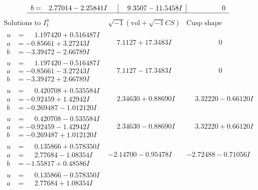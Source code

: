 \documentclass[1p]{elsarticle_modified}
\theoremstyle{definition}
\newcommand{\I}{\sqrt{-1}}
\begin{document}
$$\begin{array}{c|c|c}
\begin{aligned}
b &= \phantom{-}2.77014 - 2.25841 I\end{aligned}
 & \phantom{-}9.3507 - 11.5458 I & \phantom{-0.000000 } 0\\
 \hline 
 \end{array}$$\newpage$$\begin{array}{c|c|c}  
\text{Solutions to }I^u_{1}& \I (\text{vol} + \sqrt{-1}CS) & \text{Cusp shape}\\
 \hline 
\begin{aligned}
u &= \phantom{-}1.197420 + 0.516487 I \\
a &= -0.85661 + 3.27243 I \\
b &= -3.39472 - 2.66789 I\end{aligned}
 & \phantom{-}7.1127 + 17.3483 I & \phantom{-0.000000 } 0 \\ \hline\begin{aligned}
u &= \phantom{-}1.197420 - 0.516487 I \\
a &= -0.85661 - 3.27243 I \\
b &= -3.39472 + 2.66789 I\end{aligned}
 & \phantom{-}7.1127 - 17.3483 I & \phantom{-0.000000 } 0 \\ \hline\begin{aligned}
u &= \phantom{-}0.420708 + 0.535584 I \\
a &= -0.92459 + 1.42942 I \\
b &= -0.269487 - 1.012120 I\end{aligned}
 & \phantom{-}2.34630 + 0.88690 I & \phantom{-}3.32220 - 0.66120 I \\ \hline\begin{aligned}
u &= \phantom{-}0.420708 - 0.535584 I \\
a &= -0.92459 - 1.42942 I \\
b &= -0.269487 + 1.012120 I\end{aligned}
 & \phantom{-}2.34630 - 0.88690 I & \phantom{-}3.32220 + 0.66120 I \\ \hline\begin{aligned}
u &= \phantom{-}0.135866 + 0.578350 I \\
a &= \phantom{-}2.77684 - 1.08354 I \\
b &= -1.55817 + 0.48586 I\end{aligned}
 & -2.14700 - 0.95478 I & -2.72488 - 0.71056 I \\ \hline\begin{aligned}
u &= \phantom{-}0.135866 - 0.578350 I \\
a &= \phantom{-}2.77684 + 1.08354 I \\

\end{aligned}
\end{array}$$
\end{document}
